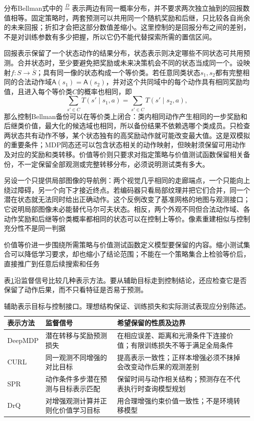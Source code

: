 分布Bellman式中的$\overset D=$表示两边有同一概率分布，并不要求两次独立抽到的回报数值相等。固定策略时，两套预测可以共用同一个随机奖励和后继，只比较各自尚余的未来回报；折扣才会把这部分数值差缩小。这里控制的是回报分布之间的差别，不是对训练参数有多少把握，所以它仍不能代替探索所需的置信区间。

回报表示保留了一个状态动作的结果分布，状态表示则决定哪些不同状态可共用预测。合并状态时，至少要避免把奖励或未来决策机会不同的状态当成同一个。设映射$f:S\to\bar{S}$；具有同一像的状态构成一个等价类。若任意同类状态$s_1,s_2$都有完整相同的合法动作域$\mathsf A(s_1)=\mathsf A(s_2)$，并对这个共同域中的每个动作具有相同奖励均值，且进入每个等价类$C$的概率也相同，即
\[
  \sum_{s'\in C}T(s'\mid s_1,a)
       =\sum_{s'\in C}T(s'\mid s_2,a),
\]
那么控制Bellman备份可以在等价类上闭合：类内相同动作产生相同的一步奖励和后继类价值，最大化的候选域也相同，所以备份结果不依赖选哪个类成员。只检查两状态共有动作不够，某个状态独有的高奖励动作就可能改变最大值。这是双模拟的重要条件；MDP同态还可以包含状态相关的动作映射，但映射须保留可用动作及对应的奖励和类转移。价值等价则只要求对指定策略与价值测试函数保留相关备份，不一定保留全部观测或完整转移分布，必须说明测试类有多大。

另设一个只提供局部图像的导航例：两个视觉几乎相同的走廊端点，一个只能向上绕过障碍，另一个向下才接近终点。若编码器只看局部纹理并把它们合并，同一个潜在状态就无法同时给出正确动作。这个反例改变了基准网格的地图与观测接口；它说明局部图像未必能替代马尔可夫状态。相反，两个外观不同但合法动作域、各动作奖励和后继等价类概率都相同的状态可以在控制上等价。像素重建相似与控制充分性不是同一判据

价值等价进一步围绕所需策略与价值测试函数定义模型要保留的内容。缩小测试集合可以降低学习要求，却也缩小了结论范围；不能在一个策略集合上检验等价后，直接推广到任意后续搜索和任务

表\ref{tab:rl-learning-representations}沿监督信号比较几种表示方法。要从辅助目标走到控制结论，还应检查它是否保留了动作后果，而不只看特征是否易于预测。

\begin{table}[t]
  \centering
  \small
  \begin{tabularx}{\linewidth}{>{\raggedright\arraybackslash}p{22mm} >{\raggedright\arraybackslash}X >{\raggedright\arraybackslash}X}
    \toprule
    表示方法 & 监督信号 & 希望保留的性质及边界 \\
    \midrule
    DeepMDP & 潜在转移与奖励预测损失 & 在相应误差、距离和光滑条件下连接价值；有限训练损失不等于满足全局条件 \\
    CURL & 同一观测不同增强的对比目标 & 提高表示一致性；正样本增强必须不抹掉会改变动作后果的观测差别 \\
    SPR & 动作条件多步潜在预测与目标表示匹配 & 保留时间与动作相关结构；预测存在不代表执行时查询模型规划 \\
    DrQ & 对增强观测计算并正则化价值学习目标 & 用合理增强约束价值一致性；不是环境转移模型 \\
    \bottomrule
  \end{tabularx}
  \caption{辅助表示目标与控制接口。理想结构保证、训练损失和实际测试表现应分别陈述。}
  \label{tab:rl-learning-representations}
\end{table}

